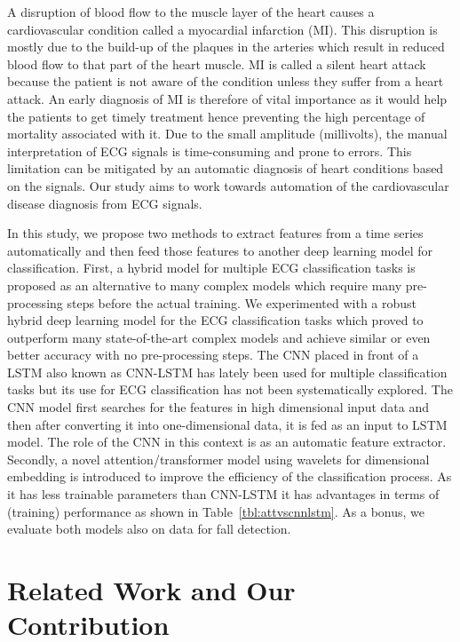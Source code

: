 \documentclass{ieeeaccess}
\begin{document}
A disruption of blood flow to the muscle layer of the heart causes a cardiovascular condition called a myocardial infarction (MI). This disruption is mostly due to the build-up of the plaques in the arteries which result in reduced blood flow to that part of the heart muscle. MI is called a silent heart attack because the patient is not aware of the condition unless they suffer from a heart attack. An early diagnosis of MI is therefore of vital importance as it would help the patients to get timely treatment hence preventing the high percentage of mortality associated with it. 
Due to the small amplitude (millivolts), the manual interpretation of ECG signals is time-consuming and prone to errors. This limitation can be mitigated by an automatic diagnosis of heart conditions based on the signals. Our study aims to work towards automation of the cardiovascular disease diagnosis from ECG signals.

In this study, we propose two methods to extract features from a time series automatically and then feed those features to another deep learning model for classification.
First, a hybrid model for multiple ECG classification tasks is proposed as an alternative to many complex models which require many pre-processing steps before the actual training. We experimented with a robust hybrid deep learning model for the ECG classification tasks which proved to outperform many state-of-the-art complex models and achieve similar or even better accuracy with no pre-processing steps. The CNN placed in front of a LSTM also known as CNN-LSTM has lately been used for multiple classification tasks but its use for ECG classification has not been systematically explored. The CNN model first searches for the features in high dimensional input data and then after converting it into one-dimensional data, it is fed as an input to LSTM model. The role of the CNN in this context is as an automatic feature extractor.
Secondly, a novel attention/transformer model using wavelets for dimensional embedding is introduced to improve the efficiency of the classification process. As it has less trainable parameters than CNN-LSTM it has advantages in terms of (training) performance as shown in Table~\ref{tbl:attvscnnlstm}. As a bonus, we evaluate both models also on data for fall detection.

\section{Related Work and Our Contribution}
\end{document}
